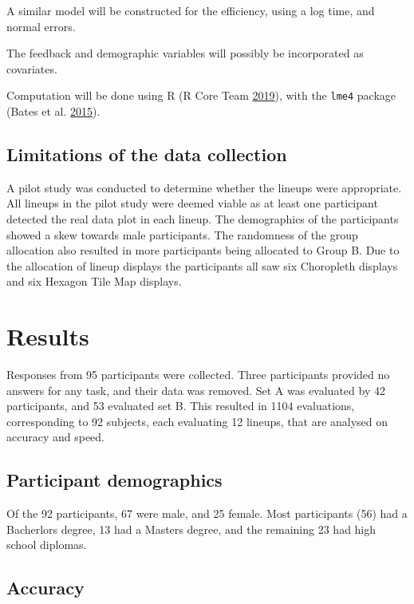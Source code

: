 \documentclass[conference,final,]{IEEEtran}
\begin{document}
A similar model will be constructed for the efficiency, using a log
time, and normal errors.

The feedback and demographic variables will possibly be incorporated as
covariates.

Computation will be done using R (R Core Team
\protect\hyperlink{ref-RCore}{2019}), with the \texttt{lme4} package
(Bates et al. \protect\hyperlink{ref-lme4}{2015}).

\hypertarget{limitations-of-the-data-collection}{%
\subsection{Limitations of the data
collection}\label{limitations-of-the-data-collection}}

A pilot study was conducted to determine whether the lineups were
appropriate. All lineups in the pilot study were deemed viable as at
least one participant detected the real data plot in each lineup. The
demographics of the participants showed a skew towards male
participants. The randomness of the group allocation also resulted in
more participants being allocated to Group B. Due to the allocation of
lineup displays the participants all saw six Choropleth displays and six
Hexagon Tile Map displays.

\hypertarget{results}{%
\section{Results}\label{results}}

Responses from 95 participants were collected. Three participants
provided no answers for any task, and their data was removed. Set A was
evaluated by 42 participants, and 53 evaluated set B. This resulted in
1104 evaluations, corresponding to 92 subjects, each evaluating 12
lineups, that are analysed on accuracy and speed.

\hypertarget{participant-demographics}{%
\subsection{Participant demographics}\label{participant-demographics}}

Of the 92 participants, 67 were male, and 25 female. Most participants
(56) had a Bacherlors degree, 13 had a Masters degree, and the remaining
23 had high school diplomas.

\hypertarget{accuracy}{%
\subsection{Accuracy}\label{accuracy}}
\end{document}
